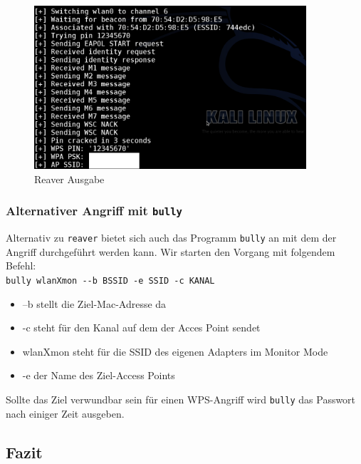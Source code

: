 						\begin{figure}[H]
							\centering
							\includegraphics[width=0.9\textwidth]{images/WLAN/reaver.png}
							\caption{Reaver Ausgabe}
							\label{fig:Reaver Ausgabe}
						\end{figure}

	\subsubsection{Alternativer Angriff mit \colorbox{altgray}{\lstinline|bully|}}

	Alternativ zu \colorbox{altgray}{\lstinline|reaver|} bietet sich auch das Programm \colorbox{altgray}{\lstinline|bully|} an mit dem der Angriff durchgeführt werden kann. Wir starten den Vorgang mit folgendem Befehl: \\
	\colorbox{altgray}{\lstinline|bully wlanXmon --b BSSID -e SSID -c KANAL|}
				\begin{itemize}
					\item --b stellt die Ziel-Mac-Adresse da
					\item -c steht für den Kanal auf dem der Acces Point sendet
					\item wlanXmon steht für die SSID des eigenen Adapters im Monitor Mode
					\item -e der Name des Ziel-Access Points
				\end{itemize}

\noindent Sollte das Ziel verwundbar sein für einen WPS-Angriff wird \colorbox{altgray}{\lstinline|bully|} das Passwort nach einiger Zeit ausgeben.

\subsection{Fazit}

